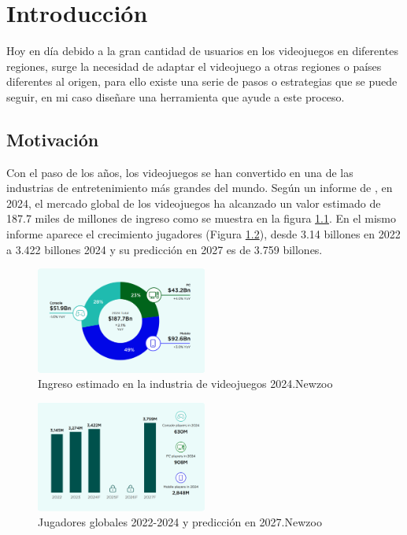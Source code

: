 \chapter{Introducción}
\label{cap:introduccion}
Hoy en día debido a la gran cantidad de usuarios en los videojuegos en diferentes regiones, surge la necesidad de adaptar el videojuego a otras regiones o países diferentes al origen, para ello existe una serie de pasos o estrategias que se puede seguir, en mi caso diseñare una herramienta que ayude a este proceso.
\section{Motivación}
Con el paso de los años, los videojuegos se han convertido en una de las industrias de entretenimiento más grandes del mundo. Según un informe de \cite{NZIngreso2024}, en 2024, el mercado global de los videojuegos ha alcanzado un valor estimado de 187.7 miles de millones de ingreso como se muestra en la figura \ref{fig:NewZooRevenues}. En el mismo informe aparece el crecimiento jugadores (Figura \ref{fig:NewzooPlayers}), desde 3.14 billones en 2022 a 3.422 billones 2024 y su predicción en 2027 es de 3.759 billones.
\begin{figure}[H]
	\centering
	\includegraphics[width = 0.5\textwidth]{Imagenes/Newzoo_2024_Revenues.png}
	\caption{Ingreso estimado en la industria de videojuegos 2024.Newzoo}
	\label{fig:NewZooRevenues}
\end{figure}

\begin{figure}[H]
	\centering
	\includegraphics[width = 0.5\textwidth]{Imagenes/Newzoo_Players.png}
	\caption{Jugadores globales 2022-2024 y predicción en 2027.Newzoo}
	\label{fig:NewzooPlayers}
\end{figure}

